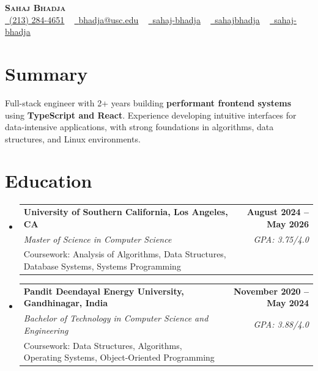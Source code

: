 \documentclass[letterpaper,10pt]{article}
\makeatletter
\newcommand{\resumeEduSubheading}[5]{\vspace{-1pt}\item\begin{tabular*}{1.0\textwidth}[t]{l@{\extracolsep{\fill}}r}\textbf{#1} & \textbf{\small #2} \\\textit{\small #3} & \textit{\small #4} \\\small #5 & \\\end{tabular*}\vspace{-4pt}}
\newcommand{\resumeSubHeadingListStart}{\begin{itemize}[leftmargin=0.0in, label={}]}
\newcommand{\resumeSubHeadingListEnd}{\end{itemize}}
\makeatother
\begin{document}
\begin{center}
{\Huge \scshape \textbf{Sahaj Bhadja}} \\ \vspace{1pt}
\small \href{tel:(213) 284-4651}{\faPhone\ \underline{(213) 284-4651}} ~ \href{mailto:bhadja@usc.edu}{\raisebox{-0.2\height}\faEnvelope\ \underline{bhadja@usc.edu}} ~
\href{https://www.linkedin.com/in/sahaj-bhadja/}{\raisebox{-0.2\height}\faLinkedin\ \underline{sahaj-bhadja}} ~ \href{https://github.com/SAHAJ-BHADJA}{\raisebox{-0.2\height}\faGithub\ \underline{sahajbhadja}} ~
\href{https://sahaj-bhadja.vercel.app/}{\raisebox{-0.2\height}\faGlobe\ \underline{sahaj-bhadja}}
\end{center}
\vspace{-18pt}
\section{Summary}
\begin{itemize}[leftmargin=0.15in, label={}]
\small{\item{Full-stack engineer with 2+ years building \textbf{performant frontend systems} using \textbf{TypeScript and React}. Experience developing intuitive interfaces for data-intensive applications, with strong foundations in algorithms, data structures, and Linux environments.}}
\end{itemize}
\vspace{-16pt}
\section{Education}
\resumeSubHeadingListStart
\resumeEduSubheading{University of Southern California, Los Angeles, CA}{August 2024 -- May 2026}{Master of Science in Computer Science}{GPA: 3.75/4.0}{Coursework: Analysis of Algorithms, Data Structures, Database Systems, Systems Programming}
\vspace{-9pt}
\resumeEduSubheading{Pandit Deendayal Energy University, Gandhinagar, India}{November 2020 -- May 2024}{Bachelor of Technology in Computer Science and Engineering}{GPA: 3.88/4.0}{Coursework: Data Structures, Algorithms, Operating Systems, Object-Oriented Programming}
\resumeSubHeadingListEnd
\vspace{-14pt}
\end{document}
